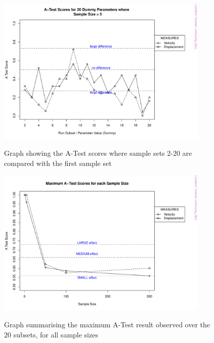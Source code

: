 \documentclass[a4paper,11pt]{article}
\begin{document}
\begin{figure}[h!]
\centering
    \includegraphics[width=0.9\textwidth]{AA_5Samples.pdf}\\ \noindent
    \caption{Graph showing the A-Test scores where sample sets 2-20 are compared with the first sample set}
    \label{AA_5Samples}
    \end{figure}

\begin{figure}[h!]
\centering
    \includegraphics[width=0.9\textwidth]{AA_Results.pdf}\\ \noindent
    \caption{Graph summarising the maximum A-Test result observed over the 20 subsets, for all sample sizes}
    \label{AA_Results}
\end{figure}
\end{document}
